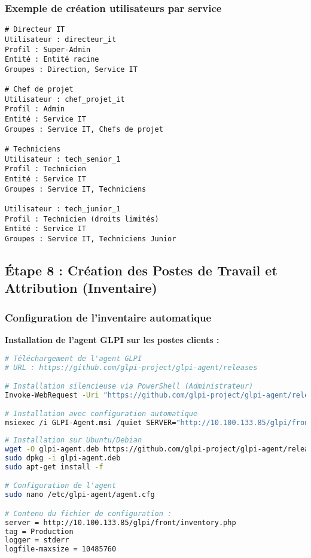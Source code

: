 \documentclass[12pt,a4paper]{article}
\begin{document}
\subsubsection{Exemple de création utilisateurs par service}
\begin{lstlisting}[caption=Utilisateurs Service Informatique]
# Directeur IT
Utilisateur : directeur_it
Profil : Super-Admin
Entité : Entité racine
Groupes : Direction, Service IT

# Chef de projet
Utilisateur : chef_projet_it
Profil : Admin  
Entité : Service IT
Groupes : Service IT, Chefs de projet

# Techniciens
Utilisateur : tech_senior_1
Profil : Technicien
Entité : Service IT
Groupes : Service IT, Techniciens

Utilisateur : tech_junior_1
Profil : Technicien (droits limités)
Entité : Service IT
Groupes : Service IT, Techniciens Junior
\end{lstlisting}

\subsection{Étape 8 : Création des Postes de Travail et Attribution (Inventaire)}

\subsubsection{Configuration de l'inventaire automatique}
\textbf{Installation de l'agent GLPI sur les postes clients :}

\begin{lstlisting}[language=bash, caption=Installation agent GLPI - Windows]
# Téléchargement de l'agent GLPI
# URL : https://github.com/glpi-project/glpi-agent/releases

# Installation silencieuse via PowerShell (Administrateur)
Invoke-WebRequest -Uri "https://github.com/glpi-project/glpi-agent/releases/download/1.7.3/GLPI-Agent-1.7.3-x64.msi" -OutFile "GLPI-Agent.msi"

# Installation avec configuration automatique
msiexec /i GLPI-Agent.msi /quiet SERVER="http://10.100.133.85/glpi/front/inventory.php" TAG="Production"
\end{lstlisting}

\begin{lstlisting}[language=bash, caption=Installation agent GLPI - Linux]
# Installation sur Ubuntu/Debian
wget -O glpi-agent.deb https://github.com/glpi-project/glpi-agent/releases/download/1.7.3/glpi-agent_1.7.3-1_amd64.deb
sudo dpkg -i glpi-agent.deb
sudo apt-get install -f

# Configuration de l'agent
sudo nano /etc/glpi-agent/agent.cfg

# Contenu du fichier de configuration :
server = http://10.100.133.85/glpi/front/inventory.php
tag = Production
logger = stderr
logfile-maxsize = 10485760
\end{lstlisting}
\end{document}
